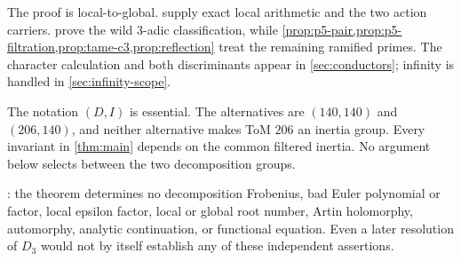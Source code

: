 The proof is local-to-global.  
supply exact local arithmetic and the two action carriers.
 prove the wild $3$-adic
classification, while
\cref{prop:p5-pair,prop:p5-filtration,prop:tame-c3,prop:reflection} treat
the remaining ramified primes.  The character calculation and both
discriminants appear in \cref{sec:conductors}; infinity is handled in
\cref{sec:infinity-scope}.

\begin{remark}
\label{rem:d3-boundary}
The notation $(D,I)$ is essential.  The alternatives are $(140,140)$ and
$(206,140)$, and neither alternative makes ToM $206$ an inertia group.
Every invariant in \cref{thm:main} depends on the common filtered inertia.
No argument below selects between the two decomposition groups.
\end{remark}

\begin{remark}
\label{rem:main-firewall}
\NoEuler: the theorem determines no decomposition Frobenius, bad Euler
polynomial or factor, local epsilon factor, local or global root number,
Artin holomorphy, automorphy, analytic continuation, or functional equation.
Even a later resolution of $D_3$ would not by itself establish any of these
independent assertions.
\end{remark}

